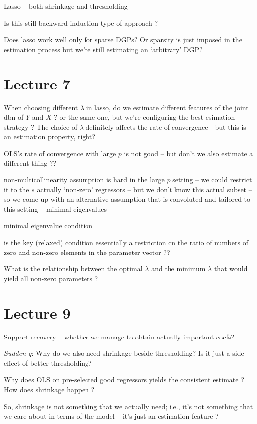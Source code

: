 \documentclass[a4paper,12pt,twoside]{article}
\begin{document}
Lasso -- both shrinkage and thresholding

Is this still backward induction type of approach ?

Does lasso work well only for sparse DGPs? Or sparsity is just imposed in the estimation process but we're still estimating an `arbitrary' DGP?


\section*{Lecture 7}


When choosing different $\lambda$ in lasso, do we estimate different features of the joint dbn of $Y$ and $X$ ? or the same one, but we're configuring the best esimation strategy ? The choice of $\lambda$ definitely affects the rate of convergence - but this is an estimation property, right?

OLS's rate of convergence with large $p$ is not good -- but don't we also estimate a different thing ??


non-multicollinearity assumption is hard in the large $p$ setting -- we could restrict it to the $s$ actually `non-zero' regressors -- but we don't know this actual subset -- so we come up with an alternative assumption that is convoluted and tailored to this setting -- minimal eigenvalues


minimal eigenvalue condition

is the key (relaxed) condition essentially a restriction on the ratio of numbers of zero and non-zero elements in the parameter vector ??


What is the relationship between the optimal $\lambda$ and the minimum $\lambda$ that would yield all non-zero parameters ?


\section*{Lecture 9}

Support recovery -- whether we manage to obtain actually important coefs?

\textit{Sudden q}: Why do we also need shrinkage beside thresholding? Is it just a side effect of better thresholding?


Why does OLS on pre-selected good regressors yields the consistent estimate ? How does shrinkage happen ?


So, shrinkage is not something that we actually need; i.e., it's not something that we care about in terms of the model -- it's just an estimation feature ?
\end{document}
